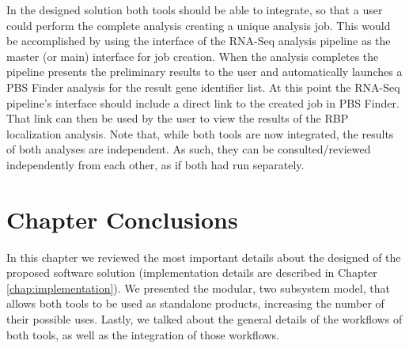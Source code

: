 In the designed solution both tools should be able to integrate, so that a user
could perform the complete analysis creating a unique analysis job. This would
be accomplished by using the interface of the RNA-Seq analysis pipeline as the
master (or main) interface for job creation. When the analysis completes the
pipeline presents the preliminary results to the user and automatically launches
a PBS Finder analysis for the result gene identifier list. At this point the
RNA-Seq pipeline's interface should include a direct link to the created job in
PBS Finder. That link can then be used by the user to view the results of the
RBP localization analysis. Note that, while both tools are now integrated, the
results of both analyses are independent. As such, they can be
consulted/reviewed independently from each other, as if both had run separately.

\section{Chapter Conclusions}


In this chapter we reviewed the most important details about the designed of the
proposed software solution (implementation details are described in Chapter
\ref{chap:implementation}). We presented the modular, two subsystem model, that
allows both tools to be used as standalone products, increasing the number of
their possible uses. Lastly, we talked about the general details of the
workflows of both tools, as well as the integration of those workflows.
